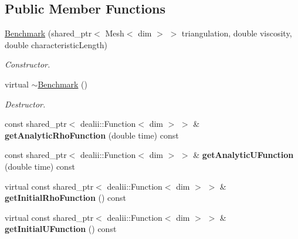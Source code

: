 \subsection*{Public Member Functions}
\begin{DoxyCompactItemize}
\item 
\hypertarget{classnatrium_1_1Benchmark_afad7bc0117bd13bf116d8b00518b774e}{
\hyperlink{classnatrium_1_1Benchmark_afad7bc0117bd13bf116d8b00518b774e}{Benchmark} (shared\_\-ptr$<$ Mesh$<$ dim $>$ $>$ triangulation, double viscosity, double characteristicLength)}
\label{classnatrium_1_1Benchmark_afad7bc0117bd13bf116d8b00518b774e}

\begin{DoxyCompactList}\small\item\em Constructor. \item\end{DoxyCompactList}\item 
\hypertarget{classnatrium_1_1Benchmark_a9560e49a097a369ec972b72fb2873a2e}{
virtual \hyperlink{classnatrium_1_1Benchmark_a9560e49a097a369ec972b72fb2873a2e}{$\sim$Benchmark} ()}
\label{classnatrium_1_1Benchmark_a9560e49a097a369ec972b72fb2873a2e}

\begin{DoxyCompactList}\small\item\em Destructor. \item\end{DoxyCompactList}\item 
\hypertarget{classnatrium_1_1Benchmark_a21e67666e47f219a441bb80697e23b63}{
const shared\_\-ptr$<$ dealii::Function$<$ dim $>$ $>$ \& {\bfseries getAnalyticRhoFunction} (double time) const }
\label{classnatrium_1_1Benchmark_a21e67666e47f219a441bb80697e23b63}

\item 
\hypertarget{classnatrium_1_1Benchmark_a398e571355ecd6a95c7f7d40cf19c783}{
const shared\_\-ptr$<$ dealii::Function$<$ dim $>$ $>$ \& {\bfseries getAnalyticUFunction} (double time) const }
\label{classnatrium_1_1Benchmark_a398e571355ecd6a95c7f7d40cf19c783}

\item 
\hypertarget{classnatrium_1_1Benchmark_a720202a91c6777d3196415fe0c1f86ea}{
virtual const shared\_\-ptr$<$ dealii::Function$<$ dim $>$ $>$ \& {\bfseries getInitialRhoFunction} () const }
\label{classnatrium_1_1Benchmark_a720202a91c6777d3196415fe0c1f86ea}

\item 
\hypertarget{classnatrium_1_1Benchmark_ae2b476e376bd1d87f754e0acdfdc1e0e}{
virtual const shared\_\-ptr$<$ dealii::Function$<$ dim $>$ $>$ \& {\bfseries getInitialUFunction} () const }
\label{classnatrium_1_1Benchmark_ae2b476e376bd1d87f754e0acdfdc1e0e}

\end{DoxyCompactItemize}
